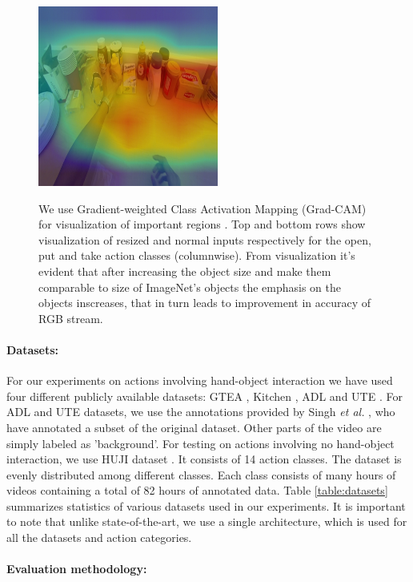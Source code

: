 \documentclass{article}
\def\etal{{\em et al. }}
\begin{document}
\begin{figure}[t]
\begin{center}
        {\includegraphics[width=0.3\linewidth, height=0.25\linewidth]{take_S4_Cheese_C1_0000000497_large}}
    \end{center}
    \caption{We use Gradient-weighted Class Activation Mapping (Grad-CAM) for visualization of important regions \cite{selvaraju2016grad}. Top and bottom rows show visualization of resized and normal inputs respectively for the open, put and take action classes (columnwise). From visualization it's evident that after increasing the object size and make them comparable to size of ImageNet's objects the emphasis on the objects inscreases, that in turn leads to improvement in accuracy of RGB stream.  }
\end{figure}

\paragraph*{Datasets:}

For our experiments on actions involving hand-object interaction we have used four different publicly available datasets: GTEA \cite{fathi2011learning}, Kitchen \cite{spriggs2009temporal}, ADL \cite{pirsiavash2012detecting} and UTE \cite{lee2012discovering}. For ADL \cite{pirsiavash2012detecting} and UTE \cite{lee2012discovering} datasets, we use the annotations provided by Singh \etal \cite{suriya2016cvpr}, who have annotated a subset of the original dataset. Other parts of the video are simply labeled as 'background'. For testing on actions involving no hand-object interaction, we use HUJI dataset \cite{poleg2016compact}. It consists of 14 action classes. The dataset is evenly distributed among different classes. Each class consists of many hours of videos containing a total of 82 hours of annotated data. Table \ref{table:datasets} summarizes statistics of various datasets used in our experiments. It is important to note that unlike state-of-the-art, we use a single architecture, which is used for all the datasets and action categories.

\paragraph*{Evaluation methodology:}
\end{document}
